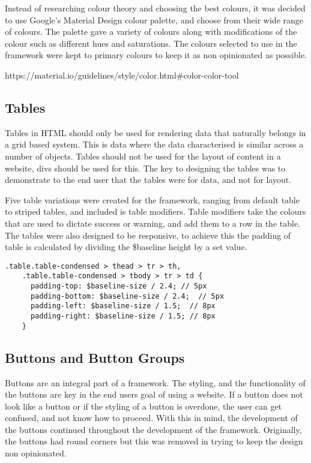 Instead of researching colour theory and choosing the best colours, it was decided to use Google's Material Design colour palette, and choose from their wide range of colours. The palette  gave a variety of colours along with modifications of the colour such as different hues and saturations. The colours selected to use in the framework were kept to primary colours to keep it as non opinionated as possible.


https://material.io/guidelines/style/color.html#color-color-tool


\subsection{Tables}

Tables in HTML should only be used for rendering data that naturally belongs in a grid based system. This is data where the data characterised is similar across a number of objects. Tables should not be used for the layout of content in a website, divs should be used for this. The key to designing the tables was to demonstrate to the end user that the tables were for data, and not for layout.

Five table variations were created for the framework, ranging from default table to striped tables, and included is table modifiers. Table modifiers take the colours that are used to dictate success or warning, and add them to a row in the table. The tables were also designed to be responsive, to achieve this the padding of table is calculated by dividing the \$baseline height by a set value. 

\begin{lstlisting}[language=CSS3]
    .table.table-condensed > thead > tr > th,
    .table.table-condensed > tbody > tr > td {
      padding-top: $baseline-size / 2.4; // 5px
      padding-bottom: $baseline-size / 2.4;  // 5px
      padding-left: $baseline-size / 1.5;  // 8px
      padding-right: $baseline-size / 1.5; // 8px
    }
\end{lstlisting}


\subsection{Buttons and Button Groups}
Buttons are an integral part of a framework. The styling, and the functionality of the buttons are key in the end users goal of using a website. If a button does not look like a button or if the styling of a button is overdone, the user can get confused, and not know how to proceed. With this in mind, the development of the buttons continued throughout the development of the framework. Originally, the buttons had round corners but this was removed in trying to keep the design non opinionated. 

